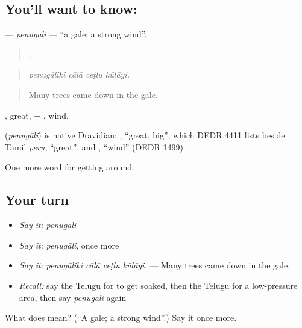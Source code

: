 \subsection*{You'll want to know: }
\textbf{} — \emph{penugāli} — \textquotedblleft{}a gale; a strong wind\textquotedblright{}.

\begin{quote}
   .
\end{quote}

\begin{quote}
\emph{penugāliki cālā ceṭlu kūlāyi.}
\end{quote}

\begin{quote}
Many trees came down in the gale.
\end{quote}

, great, + , wind.

\begin{cousinweb}
\textbf{} (\emph{penugāli}) is native Dravidian: , \textquotedblleft{}great, big\textquotedblright{}, which DEDR 4411 lists beside Tamil \emph{peru}, \textquotedblleft{}great\textquotedblright{}, and , \textquotedblleft{}wind\textquotedblright{} (DEDR 1499).
\end{cousinweb}

\begin{grammarlens}[title={What you've built}]
One more word for getting around.
\end{grammarlens}

\subsection*{Your turn}
\begin{itemize}
\raggedright
  \item \emph{Say it:} \emph{penugāli}
  \item \emph{Say it:} \emph{penugāli}, once more
  \item \emph{Say it:} \emph{penugāliki cālā ceṭlu kūlāyi.} — Many trees came down in the gale.
  \item \emph{Recall:} say the Telugu for to get soaked, then the Telugu for a low-pressure area, then say \emph{penugāli} again
\end{itemize}

\begin{tcolorbox}[breakable,colback=teal!4,colframe=teal!35!black,title={Before you move on}]
What does  mean? (\textquotedblleft{}A gale; a strong wind\textquotedblright{}.) Say it once more.
\end{tcolorbox}
